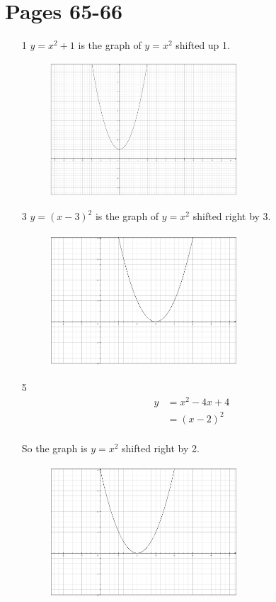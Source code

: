 \documentclass[fleqn,addpoints]{exam}
\begin{document}
\section{Pages 65-66}
\begin{itemize}

\item[1]
$y = x^2 + 1$ is the graph of $y=x^2$ shifted up 1.

\begin{figure}[H]
  \includegraphics[width=7cm,height=5cm]{1.8-1.eps}
\end{figure}

\item[3]
$y = (x - 3)^2$ is the graph of $y=x^2$ shifted right by 3.

\begin{figure}[H]
  \includegraphics[width=7cm,height=5cm]{1.8-3.eps}
\end{figure}

\item[5]
\begin{align*}
  y &= x^2 - 4x + 4 \\
   &= (x - 2)^2 \\
\end{align*}

So the graph is $y=x^2$ shifted right by 2.

\begin{figure}[H]
  \includegraphics[width=7cm,height=5cm]{1.8-5.eps}
\end{figure}


\end{itemize}
\end{document}
